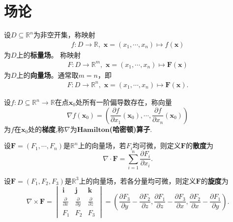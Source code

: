 \documentclass[../../main.tex]{subfiles}%
\begin{document}
\section{场论}

\begin{definition}
设$D\subseteq\mathbb{R}^n$为非空开集，称映射
\begin{align*}
f:D\to\mathbb{R},\,\,\bm{x}=(x_1,\cdots,x_n)\mapsto f(\bm{x})
\end{align*}
为$D$上的\textbf{标量场}。
称映射
\begin{align*}
F:D\to\mathbb{R}^m,\,\,\bm{x}=(x_1,\cdots,x_n)\mapsto \bm{F}(\bm{x})
\end{align*}
为$D$上的\textbf{向量场}。通常取$m=n$，即
\begin{align*}
F:D\to\mathbb{R}^n,\,\,\bm{x}=(x_1,\cdots,x_n)\mapsto \bm{F}(\bm{x}).
\end{align*}
\end{definition}

\begin{definition}
设$f:D\subseteq\mathbb{R}^n\to\mathbb{R}$在点$\bm{x}_0$处所有一阶偏导数存在，称向量
\[
\nabla f(\bm{x}_0)=\left(\frac{\partial f}{\partial x_1}(\bm{x}_0),\cdots,\frac{\partial f}{\partial x_n}(\bm{x}_0)\right)
\]
为$f$在$\bm{x}_0$处的\textbf{梯度},称$\nabla$为$\mathbf{Hamilton}$\textbf{(哈密顿)算子}.
\end{definition}

\begin{definition}
设$\bm{F}=(F_1,\cdots,F_n)$是$\mathbb{R}^n$上的向量场，若$F_i$均可微，则定义$\bm{F}$的\textbf{散度}为
\[
\nabla\cdot\bm{F}=\sum_{i=1}^{n}\frac{\partial F_i}{\partial x_i}.
\]
\end{definition}

\begin{definition}
设$\bm{F}=(F_1,F_2,F_3)$是$\mathbb{R}^3$上的向量场，若各分量均可微，则定义$\bm{F}$的\textbf{旋度}为
\[
\nabla\times\bm{F}=
\begin{vmatrix}
\bm{i} & \bm{j} & \bm{k} \\
\frac{\partial}{\partial x} & \frac{\partial}{\partial y} & \frac{\partial}{\partial z} \\
F_1 & F_2 & F_3
\end{vmatrix}
=\left(\frac{\partial F_3}{\partial y}-\frac{\partial F_2}{\partial z},\frac{\partial F_1}{\partial z}-\frac{\partial F_3}{\partial x},\frac{\partial F_2}{\partial x}-\frac{\partial F_1}{\partial y}\right).
\]
\end{definition}
\end{document}
